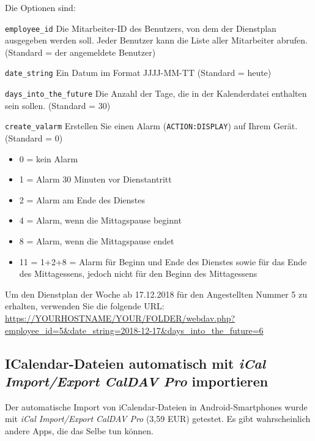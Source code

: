 Die Optionen sind:
\begin{description}
	\item \lstinline|employee_id| Die Mitarbeiter-ID des Benutzers, von dem der
Dienstplan ausgegeben werden soll. Jeder Benutzer kann die Liste aller
Mitarbeiter abrufen. (Standard = der angemeldete Benutzer)
	\item \lstinline|date_string| Ein Datum im Format JJJJ-MM-TT (Standard = heute)
	\item \lstinline|days_into_the_future| Die Anzahl der Tage, die in der
Kalenderdatei enthalten sein sollen. (Standard = 30)
	\item \lstinline|create_valarm| Erstellen Sie einen Alarm
(\lstinline|ACTION:DISPLAY|) auf Ihrem Gerät. (Standard = 0)
	\begin{itemize}
        \item 0 = kein Alarm
        \item 1 = Alarm 30 Minuten vor Dienstantritt
        \item 2 = Alarm am Ende des Dienstes
        \item 4 = Alarm, wenn die Mittagspause beginnt
        \item 8 = Alarm, wenn die Mittagspause endet
        \item 11 = 1+2+8 = Alarm für Beginn und Ende des Dienstes sowie für das Ende des
Mittagessens, jedoch nicht für den Beginn des Mittagessens
    \end{itemize}
\end{description}

Um den Dienstplan der Woche ab 17.12.2018 für den Angestellten Nummer 5 zu
erhalten, verwenden Sie die folgende URL:
\url{https://YOURHOSTNAME/YOUR/FOLDER/webdav.php?employee_id=5&date_string=2018-12-17&days_into_the_future=6}

\subsection{ICalendar-Dateien automatisch mit \emph{iCal Import/Export CalDAV Pro}
importieren}
Der automatische Import von iCalendar-Dateien in Android-Smartphones wurde
mit \emph{iCal Import/Export CalDAV Pro} (3,59 EUR) getestet. Es gibt
wahrscheinlich andere Apps, die das Selbe tun können.

